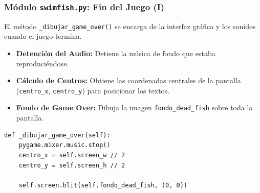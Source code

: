 \documentclass[
	11pt, %
]{beamer}
\begin{document}
\begin{frame}[fragile]
\frametitle{Módulo \texttt{swimfish.py}: Fin del Juego (I)}

El método \texttt{\_dibujar\_game\_over()} se encarga de la interfaz gráfica
y los sonidos cuando el juego termina.

\begin{itemize}
    \item \textbf{Detención del Audio:} Detiene la música de fondo que estaba reproduciéndose.
    \item \textbf{Cálculo de Centros:} Obtiene las coordenadas centrales de la pantalla
          (\texttt{centro\_x}, \texttt{centro\_y}) para posicionar los textos.
    \item \textbf{Fondo de Game Over:} Dibuja la imagen \texttt{fondo\_dead\_fish} sobre toda la pantalla.
\end{itemize}

\vspace{4pt}
{\scriptsize
\begin{verbatim}
def _dibujar_game_over(self):
    pygame.mixer.music.stop()
    centro_x = self.screen_w // 2
    centro_y = self.screen_h // 2

    self.screen.blit(self.fondo_dead_fish, (0, 0))
\end{verbatim}
}

\end{frame}

\end{document}
